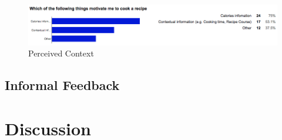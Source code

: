 \begin{figure}[h]
	\centering
	\includegraphics[width= 1\linewidth]{figures/ch5_stat_context}
	\caption{Perceived Context}
	\label{fig:ch5_stat_context}
\end{figure}


\subsection{Informal Feedback}

\section{Discussion}
